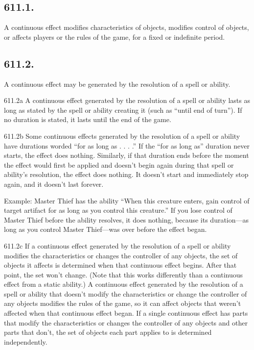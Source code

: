 \subsection*{611.1.}
A continuous effect modifies characteristics of objects, modifies control of objects, or affects players or the rules of the game, for a fixed or indefinite period.

\subsection*{611.2.}
A continuous effect may be generated by the resolution of a spell or ability.

611.2a A continuous effect generated by the resolution of a spell or ability lasts as long as stated by the spell or ability creating it (such as “until end of turn”). If no duration is stated, it lasts until the end of the game.

611.2b Some continuous effects generated by the resolution of a spell or ability have durations worded “for as long as . . . .” If the “for as long as” duration never starts, the effect does nothing. Similarly, if that duration ends before the moment the effect would first be applied and doesn’t begin again during that spell or ability’s resolution, the effect does nothing. It doesn’t start and immediately stop again, and it doesn’t last forever.

Example: Master Thief has the ability “When this creature enters, gain control of target artifact for as long as you control this creature.” If you lose control of Master Thief before the ability resolves, it does nothing, because its duration—as long as you control Master Thief—was over before the effect began.

611.2c If a continuous effect generated by the resolution of a spell or ability modifies the characteristics or changes the controller of any objects, the set of objects it affects is determined when that continuous effect begins. After that point, the set won’t change. (Note that this works differently than a continuous effect from a static ability.) A continuous effect generated by the resolution of a spell or ability that doesn’t modify the characteristics or change the controller of any objects modifies the rules of the game, so it can affect objects that weren’t affected when that continuous effect began. If a single continuous effect has parts that modify the characteristics or changes the controller of any objects and other parts that don’t, the set of objects each part applies to is determined independently.

